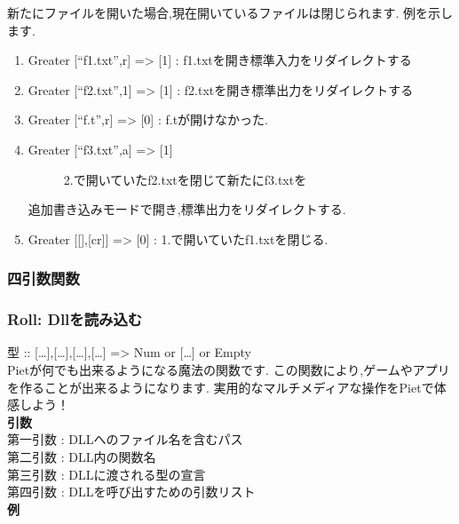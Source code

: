 新たにファイルを開いた場合,現在開いているファイルは閉じられます.
例を示します.

\begin{enumerate}[1.]
\item
  Greater {[}``f1.txt'',r{]} =\textgreater{} {[}1{]} :
  f1.txtを開き標準入力をリダイレクトする
\item
  Greater {[}``f2.txt'',1{]} =\textgreater{} {[}1{]} :
  f2.txtを開き標準出力をリダイレクトする
\item
  Greater {[}``f.t'',r{]} =\textgreater{} {[}0{]} : f.tが開けなかった.
\item
  \begin{description}
  \item[Greater {[}``f3.txt'',a{]} =\textgreater{} {[}1{]}]
  2.で開いていたf2.txtを閉じて新たにf3.txtを
  \end{description}

  追加書き込みモードで開き,標準出力をリダイレクトする.
\item
  Greater {[}{[}{]},{[}cr{]}{]} =\textgreater{} {[}0{]} :
  1.で開いていたf1.txtを閉じる.
\end{enumerate}

\subsubsection{四引数関数}

\subsubsection{Roll: Dllを読み込む}

型 :: {[}\ldots{}{]},{[}\ldots{}{]},{[}\ldots{}{]},{[}\ldots{}{]}
=\textgreater{} Num or {[}\ldots{}{]} or
Empty\\Pietが何でも出来るようになる魔法の関数です.
この関数により,ゲームやアプリを作ることが出来るようになります.
実用的なマルチメディアな操作をPietで体感しよう！\\\textbf{引数}\\第一引数
: DLLへのファイル名を含むパス\\第二引数 : DLL内の関数名\\第三引数 :
DLLに渡される型の宣言\\第四引数 :
DLLを呼び出すための引数リスト\\\textbf{例}

